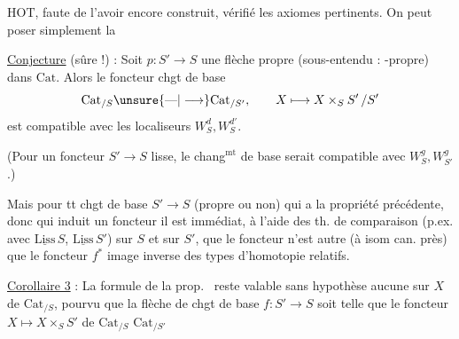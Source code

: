 $\mathrm{HOT}$, faute de l'avoir encore construit,  vérifié les axiomes pertinents. On peut poser simplement la

\uline{Conjecture} (sûre !) : Soit $p:S'\longrightarrow S$ une flèche propre (sous-entendu : -propre) dans $\mathrm{Cat}$. Alors le foncteur chgt de base
\[
\mathrm{Cat}_{/S}\unsure{\text{---}|\longrightarrow}\mathrm{Cat}_{/S'},\qquad X\longmapsto X\times_S S'\,/S'
\]
est compatible avec les localiseurs $W_S^d,W_S^{d'}$.

(Pour un foncteur $S'\longrightarrow S$ lisse, le chang$^{\mathrm{mt}}$ de base serait compatible avec $W_S^g,W_{S'}^g$.)

Mais pour tt chgt de base $S'\longrightarrow S$ (propre ou non) qui a la propriété précédente, donc qui induit un foncteur
il est immédiat, à l'aide des th. de comparaison (p.ex. avec $\underline{\mathrm{Liss}}\,S$, $\underline{\mathrm{Liss}}\,S'$) sur $S$ et sur $S'$, que le foncteur n'est autre (à isom can. près) que le foncteur $f^*$ image inverse des types d'homotopie relatifs. 

\uline{Corollaire 3} : La formule de la prop.~ reste valable sans hypothèse aucune sur $X$ de $\mathrm{Cat}_{/S}$, pourvu que la flèche de chgt de base $f:S'\longrightarrow S$ soit telle que le foncteur $X\longmapsto X\times_S S'$ de $\mathrm{Cat}_{/S}$  $\mathrm{Cat}_{/S'}$
